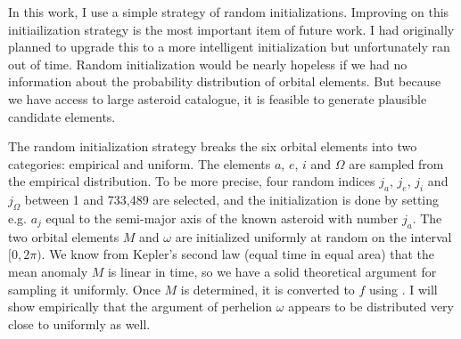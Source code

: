 In this work, I use a simple strategy of random initializations.
Improving on this initiailization strategy is the most important item of future work.
I had originally planned to upgrade this to a more intelligent initialization but unfortunately ran out of time.
Random initialization would be nearly hopeless if we had no information about the probability distribution of orbital elements.
But because we have access to large asteroid catalogue, it is feasible to generate plausible candidate elements.

The random initialization strategy breaks the six orbital elements into two categories: empirical and uniform.
The elements $a$, $e$, $i$ and $\Omega$ are sampled from the empirical distribution.
To be more precise, four random indices $j_{a}$, $j_{e}$, $j_{i}$ and $j_{\Omega}$ between 1 and 733,489 are selected, 
and the initialization is done by setting e.g. $a_{j}$ equal to the semi-major axis of the known asteroid with number $j_{a}$.
The two orbital elements $M$ and $\omega$ are initialized uniformly at random on the interval $[0, 2\pi)$.
We know from Kepler's second law (equal time in equal area) that the mean anomaly $M$ is linear in time,
so we have a solid theoretical argument for sampling it uniformly.
Once $M$ is determined, it is converted to $f$ using .
I will show empirically that the argument of perhelion $\omega$ appears to be distributed very close to uniformly as well.

